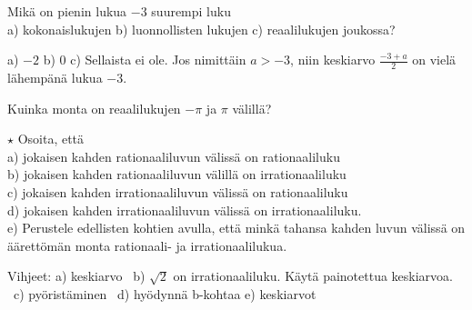\begin{tehtavasivu}
\begin{tehtava}
Mikä on pienin lukua $-3$ suurempi luku \\
a) kokonaislukujen b) luonnollisten lukujen c) reaalilukujen joukossa?
\begin{vastaus}
a) $-2$ b) $0$ c) Sellaista ei ole. Jos nimittäin $a > -3$, niin keskiarvo
$\frac{-3+a}{2}$ on vielä lähempänä lukua $-3$. 
\end{vastaus}
\end{tehtava}

\begin{tehtava}
Kuinka monta 
on reaalilukujen \(-\pi\) ja \(\pi\) välillä?
\begin{vastaus}
\end{vastaus}
\end{tehtava}

\begin{tehtava}
$\star$ Osoita, että \\
a) jokaisen kahden rationaaliluvun välissä on rationaaliluku \\
b) jokaisen kahden rationaaliluvun välillä on irrationaaliluku \\
c) jokaisen kahden irrationaaliluvun välissä on rationaaliluku \\
d) jokaisen kahden irrationaaliluvun välissä on irrationaaliluku. \\
e) Perustele edellisten kohtien avulla, että minkä tahansa kahden luvun
välissä on äärettömän monta rationaali- ja irrationaalilukua.
\begin{vastaus}
Vihjeet: a) keskiarvo \ b) $\sqrt{2}$ on irrationaaliluku. Käytä
painotettua keskiarvoa. \ c) pyöristäminen \ d) hyödynnä b-kohtaa
e) keskiarvot %
\end{vastaus}
\end{tehtava}

\end{tehtavasivu}
